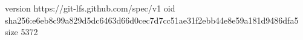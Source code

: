 version https://git-lfs.github.com/spec/v1
oid sha256:e6eb8c99a829d5dc6463d66d0cec7d7cc51ae31f2ebb44e8e59a181d9486dfa5
size 5372
